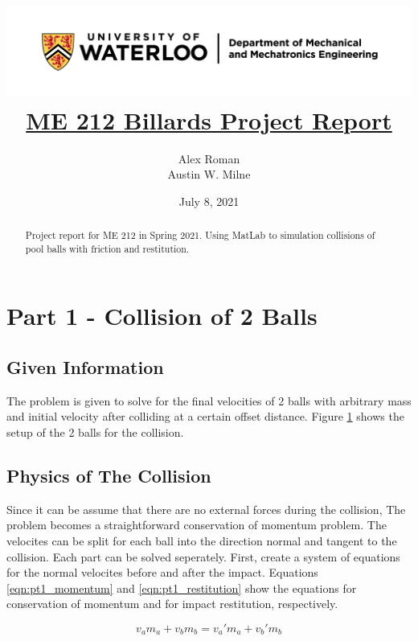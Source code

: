 \documentclass[12pt]{article}
\title{
    \includegraphics[width=\linewidth]{resources/uwaterloo_mechanical_and_mechatronics_engineering/UWaterloo_Mechanical_and_Mechatronics_Engineering/PNG/UWaterloo_Mechanical_Mechatronics_Eng_Logo_horiz_rgb.png}
    \\[1cm]
    \underline{\bf{ME 212 Billards Project Report}}
}
\author{
    Alex Roman\\
    Austin W. Milne
}
\date{July 8, 2021}
\begin{document}
\maketitle
\vfill
\begin{abstract}
    Project report for ME 212 in Spring 2021. Using MatLab to simulation collisions of pool balls 
    with friction and restitution.
\end{abstract}
\newpage

\tableofcontents
\listoftables
\listoffigures
\lstlistoflistings

\newpage


\section{Part 1 - Collision of 2 Balls}
\subsection{Given Information}
The problem is given to solve for the final velocities of 2 balls with arbitrary mass and initial velocity
after colliding at a certain offset distance. Figure \ref{P1_diag} shows the setup of the 2 balls for the collision.

\begin{figure}[H]
    \centering
    
    \label{P1_diag}
\end{figure}

\subsection{Physics of The Collision}

Since it can be assume that there are no external forces during the collision, The problem becomes a 
straightforward conservation of momentum problem. The velocites can be split for each ball into the direction
normal and tangent to the collision. Each part can be solved seperately. First, create a system of equations
for the normal velocites before and after the impact. Equations \ref{eqn:pt1_momentum} and \ref{eqn:pt1_restitution} show the 
equations for conservation of momentum and for impact restitution, respectively.

\begin{equation}
    \label{eqn:pt1_momentum}
    v_a m_a + v_b m_b = v_a' m_a + v_b' m_b
\end{equation}
\end{document}
